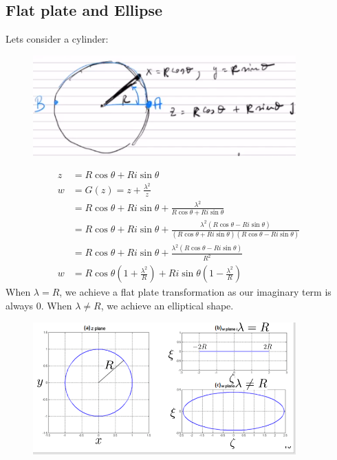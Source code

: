 \documentclass[class=report, crop=false, 12pt,a4paper]{standalone}
\begin{document}
\subsection{Flat plate and Ellipse}
Lets consider a cylinder:
\begin{figure}[H]
  \centering
  \includegraphics[width = 0.9\textwidth]{../img/diagram33.png}
\end{figure}
\begin{align}
  z &= R\cos{\theta} + Ri\sin{\theta}\\
  w &= G(z) = z + \frac{\lambda^2}{z}\\
  &=  R\cos{\theta} + Ri\sin{\theta} + \frac{\lambda^2}{R\cos{\theta} + Ri\sin{\theta}}\\
  &= R\cos{\theta} + Ri\sin{\theta} + \frac{\lambda^2 (R\cos{\theta} - Ri\sin{\theta})}{(R\cos{\theta} + Ri\sin{\theta})(R\cos{\theta} - Ri\sin{\theta})}\\
  &= R\cos{\theta} + Ri\sin{\theta} + \frac{\lambda^2 (R\cos{\theta} - Ri\sin{\theta})}{R^2}\\
  w &= R\cos{\theta} \left(1 + \frac{\lambda^2}{R}\right) + Ri\sin{\theta} \left(1 - \frac{\lambda^2}{R}\right)
\end{align}
When $\lambda = R$, we achieve a flat plate transformation as our imaginary term is always 0. When $\lambda \neq R$, we achieve an elliptical shape.
\begin{figure}[H]
  \centering
  \includegraphics[width = 0.9\textwidth]{../img/diagram34.png}
\end{figure}
\end{document}
